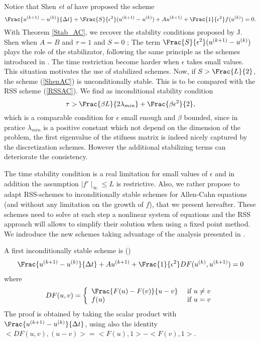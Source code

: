 {\begin{theorem_amiens}
\begin{itemize}
$$$$
\end{itemize} 
\label{Stab_AC}
\end{theorem_amiens}
\begin{remark}
Notice that Shen {\it et al }\cite{JShenACCH} have proposed the scheme
 \begin{equation}
 \Frac{u^{(k+1)}-u^{(k)}}{\Delta t} +\Frac{S}{\epsilon^2} (u^{(k+1)}-u^{(k)}) +Au^{(k+1)}+\Frac{1}{\epsilon^2}f(u^{(k)}) =0.
 \label{ShenAC}
 \end{equation}
With Theorem \ref{Stab_AC}, we recover the stability conditions proposed by J. Shen when $A=B$ and $\tau=1$ and $S=0$ ; The term $\Frac{S}{\epsilon^2} (u^{(k+1)}-u^{(k)})$ plays the role of the stabilizator, following the same principle as the schemes introduced in \cite{BCostaPHD,CDGT}. The time restriction become harder when $\epsilon$
takes small values. This situation motivates the use of stabilized schemes.
Now, if $S>\Frac{L}{2}$, the scheme (\ref{ShenAC}) is unconditionally stable. This is to be compared with the RSS scheme (\ref{RSSAC}). We find as inconditional stability condition
$$
\tau > \Frac{\beta L}{2\lambda_{min}}+\Frac{\beta\epsilon^2}{2},
$$
which is a comparable condition for $\epsilon$ small enough and $\beta$ bounded, since in pratice $\lambda_{min}$ is a positive constant which not depend on the dimension of the problem,  the first eigenvalue of the stifness matrix is indeed nicely captured by the discretization schemes.  However the additional stabilizing terms can deteriorate the consistency. 
\end{remark}

The time stability condition is a real limitation for small values of $\epsilon$ and in addition the assumption $\mid f'\mid_{\infty}\le L$ is restrictive. Also, we rather propose to adapt RSS-schemes to inconditionally stable schemes for Allen-Cahn equations (and without any limitation on the growth of $f$), that we present hereafter. These schemes need to solve at each step a nonlinear system of equations and the RSS approach will allows to simplify their solution when using a fixed point method. We indroduce the new schemes taking advantage of the analysis presented in \cite{Elliot,Eyre}.

A first inconditionally stable scheme is (\cite{Elliot})
\begin{eqnarray}
 \Frac{u^{(k+1)}-u^{(k)}}{\Delta t} +Au^{(k+1)}+\Frac{1}{\epsilon^2}DF(u^{(k)},u^{(k+1)})=0
 \label{ISAC1}
 \end{eqnarray}
where
$$
DF(u,v)=\left\{
\begin{array}{ll}
\Frac{F(u)-F(v)}{u-v} & \mbox{ if } u\neq v\\
f(u) & \mbox{ if } u= v\\
\end{array}
\right.
$$
The proof is obtained by taking the scalar product with  
$\Frac{u^{(k+1)}-u^{(k)}}{\Delta t}$, using also the identity
$<DF(u,v),(u-v)>=<F(u),1>-<F(v),1>$.

}

